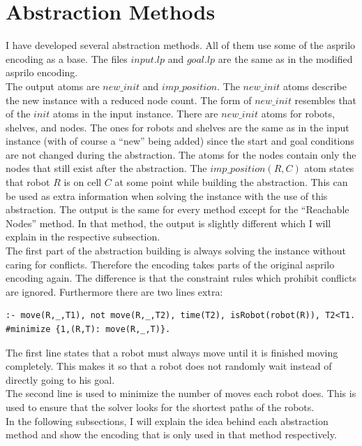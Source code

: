 \documentclass[runningheads]{llncs}
\begin{document}
\section{Abstraction Methods}
I have developed several abstraction methods. All of them use some of the asprilo encoding as a base. The files $input.lp$ and $goal.lp$ are the same as in the modified asprilo encoding. \\
The output atoms are $new\_init$ and $imp\_position$. The $new\_init$ atoms describe the new instance with a reduced node count. The form of $new\_init$ resembles that of the $init$ atoms in the input instance. There are $new\_init$ atoms for robots, shelves, and nodes. The ones
for robots and shelves are the same as in the input instance (with of course a ``new'' being added) since the start and goal conditions are not changed during the abstraction. The atoms for the nodes contain only the nodes that still exist after the abstraction. The $imp\_position(R, C)$ atom states that robot $R$ is on cell $C$ at some point while building the abstraction. This can be used as extra information when solving the instance with the use of this abstraction. The output is the same for every method except for the ``Reachable Nodes'' method. In that method, the output is slightly different which I will explain in the respective subsection. \\
The first part of the abstraction building is always solving the instance without caring for conflicts. Therefore the encoding takes parts of the original asprilo encoding again. The difference is that the constraint rules which prohibit conflicts are ignored.
Furthermore there are two lines extra:
\begin{verbatim}
:- move(R,_,T1), not move(R,_,T2), time(T2), isRobot(robot(R)), T2<T1.
#minimize {1,(R,T): move(R,_,T)}.
\end{verbatim}
The first line states that a robot must always move until it is finished moving completely. This makes it so that a robot does not randomly wait instead of directly going to his goal. \\
The second line is used to minimize the number of moves each robot does. This is used to ensure that the solver looks for the shortest paths of the robots. \\
In the following subsections, I will explain the idea behind each abstraction method and show the encoding that is only used in that method respectively. 
\end{document}

